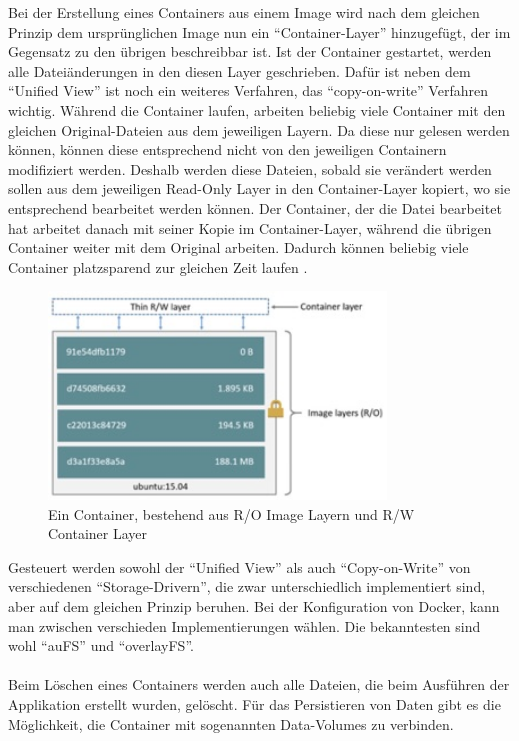 Bei der Erstellung eines Containers aus einem Image wird nach dem gleichen Prinzip dem ursprünglichen Image nun ein “Container-Layer” hinzugefügt, der im Gegensatz zu den übrigen beschreibbar ist. Ist der Container gestartet, werden alle Dateiänderungen in den diesen Layer geschrieben. Dafür ist neben dem “Unified View” ist noch ein weiteres Verfahren, das “copy-on-write” Verfahren wichtig. Während die Container laufen, arbeiten beliebig viele Container mit den gleichen Original-Dateien aus dem jeweiligen Layern. Da diese nur gelesen werden können, können diese entsprechend nicht von den jeweiligen Containern modifiziert werden. Deshalb werden diese Dateien, sobald sie verändert werden sollen aus dem jeweiligen Read-Only Layer in den Container-Layer kopiert, wo sie entsprechend bearbeitet werden können.
Der Container, der die Datei bearbeitet hat arbeitet danach mit seiner Kopie im Container-Layer, während die übrigen Container weiter mit dem Original arbeiten. Dadurch können beliebig viele Container platzsparend zur gleichen Zeit laufen \cite{docker:images}.\\

\begin{figure}[!ht]
  \centering
  \includegraphics[width=0.8\textwidth]{images/docker-container.jpg}
  \caption{Ein Container, bestehend aus R/O Image Layern und R/W Container Layer \cite{docker:images}}
\end{figure}

Gesteuert werden sowohl der “Unified View” als auch “Copy-on-Write” von verschiedenen “Storage-Drivern”, die zwar unterschiedlich implementiert sind, aber auf dem gleichen Prinzip beruhen. Bei der Konfiguration von Docker, kann man zwischen verschieden Implementierungen wählen. Die bekanntesten sind wohl “auFS” und “overlayFS”.

\paragraph{}
Beim Löschen  eines Containers werden auch alle Dateien, die beim Ausführen der Applikation erstellt wurden, gelöscht. Für das Persistieren von Daten gibt es die Möglichkeit, die Container mit sogenannten Data-Volumes zu verbinden.

